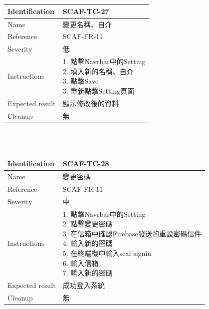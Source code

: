 \documentclass{report}
\begin{document}
\\
\newline
\\
\begin{tabularx}{\textwidth}{
  |p{}%
  |p{}|%
  }
  \hline
  \centering Identification &  SCAF-TC-27 \\
  \hline
  \centering Name & 變更名稱、自介 \\
  \hline
  \centering Reference & SCAF-FR-11 \\
  \hline
  \centering Severity & 低 \\
  \hline
  \centering Instructions & 
  \makecell[l]{
    1. 點擊Navrbar中的Setting \\
    2. 填入新的名稱、自介 \\
    3. 點擊Save \\
    3. 重新點擊Setting頁面
  }\\
  \hline
  \centering Expected result & 顯示修改後的資料 \\
  \hline
  \centering Cleanup & 無 \\
  \hline
\end{tabularx}
\\
\newline
\\
\begin{tabularx}{\textwidth}{
  |p{}%
  |p{}|%
  }
  \hline
  \centering Identification &  SCAF-TC-28 \\
  \hline
  \centering Name & 變更密碼 \\
  \hline
  \centering Reference & SCAF-FR-11 \\
  \hline
  \centering Severity & 中 \\
  \hline
  \centering Instructions & 
  \makecell[l]{
    1. 點擊Navrbar中的Setting \\
    2. 點擊變更密碼 \\
    3. 在信箱中確認Firebase發送的重設密碼信件 \\
    4. 輸入新的密碼 \\
    5. 在終端機中輸入scaf signin\\
    6. 輸入信箱 \\
    7. 輸入新的密碼 \\
  }\\
  \hline
  \centering Expected result & 成功登入系統 \\
  \hline
  \centering Cleanup & 無 \\
  \hline
\end{tabularx}
\end{document}
